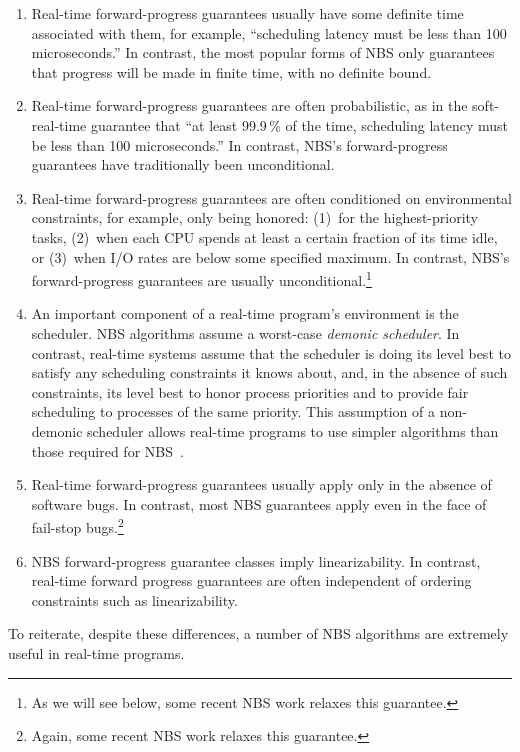 \begin{enumerate}
\item	Real-time forward-progress guarantees usually have some
	definite time associated with them, for example,
	``scheduling latency must be less than 100 microseconds.''
	In contrast, the most popular forms of NBS only guarantees
	that progress will be made in finite time, with no definite
	bound.
\item	Real-time forward-progress guarantees are often
	probabilistic, as in the soft-real-time guarantee that
	``at least 99.9\,\% of the time, scheduling latency must
	be less than 100 microseconds.''
	In contrast, NBS's forward-progress
	guarantees have traditionally been unconditional.
\item	Real-time forward-progress guarantees are often conditioned on
	environmental constraints, for example, only being honored:
	(1)~for the highest-priority tasks,
	(2)~when each CPU spends at least a certain fraction of its time idle,
	or (3)~when I/O rates are below some specified maximum.
	In contrast, NBS's forward-progress
	guarantees are usually unconditional.\footnote{
		As we will see below, some recent NBS work relaxes
		this guarantee.}
\item	An important component of a real-time program's environment
	is the scheduler.
	NBS algorithms assume a worst-case \emph{demonic scheduler}.
	In contrast, real-time systems assume that the scheduler is
	doing its level best to satisfy any scheduling constraints
	it knows about, and, in the absence of such constraints,
	its level best to honor process priorities and to provide
	fair scheduling to processes of the same priority.
	This assumption of a non-demonic scheduler allows real-time
	programs to use simpler algorithms than those required for
	NBS~\cite{DanAlitarh2013PracticalProgress,BjoernBrandenburgPhD}.
\item	Real-time forward-progress guarantees usually apply only
	in the absence of software bugs.
	In contrast, most NBS guarantees apply even in the face of
	fail-stop bugs.\footnote{
		Again, some recent NBS work relaxes this guarantee.}
\item	NBS forward-progress guarantee classes imply linearizability.
	In contrast, real-time forward progress guarantees are often
	independent of ordering constraints such as linearizability.
\end{enumerate}

To reiterate, despite these differences, a number of NBS algorithms are
extremely useful in real-time programs.

